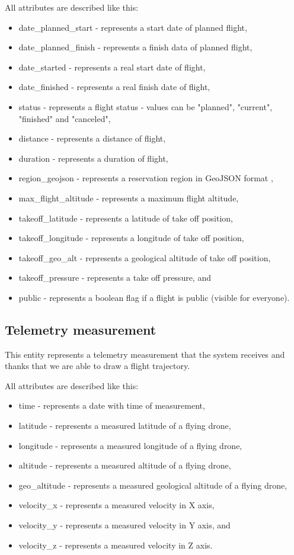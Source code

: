 All attributes are described like this:
\begin{itemize}
    \item date\_planned\_start - represents a start date of planned flight,
    \item date\_planned\_finish - represents a finish data of planned flight,
    \item date\_started - represents a real start date of flight,
    \item date\_finished - represents a real finish date of flight,
    \item status - represents a flight status - values can be "planned", "current", "finished" and "canceled",
    \item distance - represents a distance of flight,
    \item duration - represents a duration of flight,
    \item region\_geojson - represents a reservation region in GeoJSON format \cite{geoJson},
    \item max\_flight\_altitude - represents a maximum flight altitude,
    \item takeoff\_latitude - represents a latitude of take off position,
    \item takeoff\_longitude - represents a longitude of take off position,
    \item takeoff\_geo\_alt - represents a geological altitude of take off position,
    \item takeoff\_pressure - represents a take off pressure, and
    \item public - represents a boolean flag if a flight is public (visible for everyone).
\end{itemize}

\subsection{Telemetry measurement}\label{subsec:telemetry-measurement}
This entity represents a telemetry measurement that the system receives and thanks that we are able to draw a flight trajectory.

All attributes are described like this:
\begin{itemize}
    \item time - represents a date with time of measurement,
    \item latitude - represents a measured latitude of a flying drone,
    \item longitude - represents a measured longitude of a flying drone,
    \item altitude - represents a measured altitude of a flying drone,
    \item geo\_altitude - represents a measured geological altitude of a flying drone,
    \item velocity\_x - represents a measured velocity in X axis,
    \item velocity\_y - represents a measured velocity in Y axis, and
    \item velocity\_z - represents a measured velocity in Z axis.
\end{itemize}

